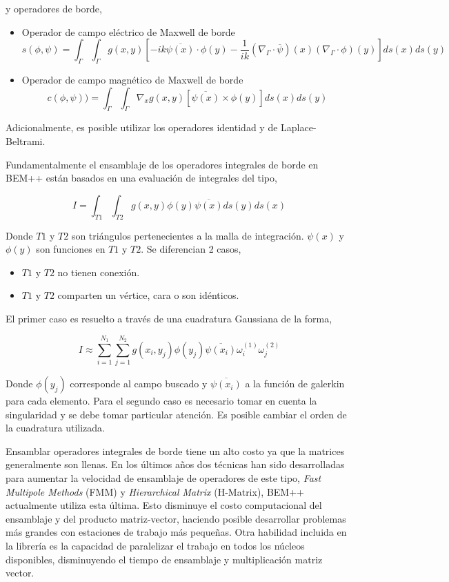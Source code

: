 \documentclass[12pt,letterpaper]{article}
\numberwithin{equation}{section}
\begin{document}
y operadores de borde,
\begin{itemize}
	\item Operador de campo eléctrico de Maxwell de borde
	$$s(\phi,\psi)=\int_{\Gamma}\int_{\Gamma}g(x,y)\left[ -ik\overline{\psi (x)}\cdotp\phi(y)-\frac{1}{ik}\left( \nabla_\Gamma\cdotp\overline{\psi}\right) (x)\left( \nabla_\Gamma\cdotp\phi\right) (y)\right] ds(x)ds(y)$$
	\item Operador de campo magnético de Maxwell de borde
	$$c(\phi,\psi))=\int_{\Gamma}\int_{\Gamma}\nabla_xg(x,y)\left[\overline{\psi (x)}\times\phi(y) \right] ds(x)ds(y)$$
\end{itemize}

Adicionalmente, es posible utilizar los operadores identidad y de Laplace-Beltrami.

Fundamentalmente el ensamblaje de los operadores integrales de borde en BEM++ están basados en una evaluación de integrales del tipo,

$$I=\int_{T1}\int_{T2}g(x,y)\phi(y)\overline{\psi(x)}ds(y)ds(x)$$

Donde $T1$ y $T2$ son triángulos pertenecientes a la malla de integración. $\psi(x)$ y $\phi(y)$ son funciones en $T1$ y $T2$. Se diferencian 2 casos,

\begin{itemize}
	\item $T1$ y $T2$ no tienen conexión.
	\item $T1$ y $T2$ comparten un vértice, cara o son idénticos.
\end{itemize}

El primer caso es resuelto a través de una cuadratura Gaussiana de la forma,

$$I\approx\sum\limits_{i=1}^{N_1}\sum\limits_{j=1}^{N_2}g(x_i,y_j)\phi(y_j)\overline{\psi(x_i)}\omega_i^{(1)}\omega_j^{(2)}$$ 

Donde $\phi(y_j)$ corresponde al campo buscado y $\overline{\psi(x_i)}$ a la función de galerkin para cada elemento. Para el segundo caso es necesario tomar en cuenta la singularidad y se debe tomar particular atención. Es posible cambiar el orden de la cuadratura utilizada.

Ensamblar operadores integrales de borde tiene un alto costo ya que la matrices generalmente son llenas. En los últimos años dos técnicas han sido desarrolladas para aumentar la velocidad de ensamblaje de operadores de este tipo, \textit{Fast Multipole Methods} (FMM) y \textit{Hierarchical Matrix} (H-Matrix), BEM++ actualmente utiliza esta última. Esto disminuye el costo computacional del ensamblaje y del producto matriz-vector, haciendo posible desarrollar problemas más grandes con estaciones de trabajo más pequeñas. Otra habilidad incluida en la librería es la capacidad de paralelizar el trabajo en todos los núcleos disponibles, disminuyendo el tiempo de ensamblaje y multiplicación matriz vector.
\end{document}
